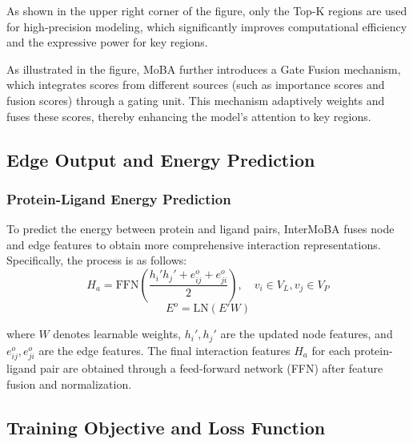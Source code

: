 \documentclass[11pt,a4paper]{article}
\begin{document}
As shown in the upper right corner of the figure, only the Top-K regions
are used for high-precision modeling, which significantly improves
computational efficiency and the expressive power for key regions.

As illustrated in the figure, MoBA further introduces a Gate Fusion
mechanism, which integrates scores from different sources (such as
importance scores and fusion scores) through a gating unit. This
mechanism adaptively weights and fuses these scores, thereby enhancing
the model's attention to key regions.

\subsection{Edge Output and Energy Prediction}
\subsubsection{Protein-Ligand Energy Prediction}
To predict the energy between protein and ligand pairs, InterMoBA fuses
node and edge features to obtain more comprehensive
interaction representations. Specifically, the process is as follows:
\begin{equation}
H_{a} = \text{FFN}\left( \frac{h_{i}'h_{j}' + e_{ij}^{o} + e_{ji}^{o}}{2} \right), \quad v_{i} \in V_{L}, v_{j} \in V_{P}
\end{equation}
\begin{equation}
E^{o} = \text{LN}\left( E'W \right)
\end{equation}

where $W$ denotes learnable weights, $h_{i}',h_{j}'$ are the updated
node features, and $e_{ij}^{o},e_{ji}^{o}$ are the edge features. The
final interaction features $H_{a}$ for each protein-ligand pair are
obtained through a feed-forward network (FFN) after feature fusion and
normalization.

\subsection{Training Objective and Loss Function}
\end{document}
